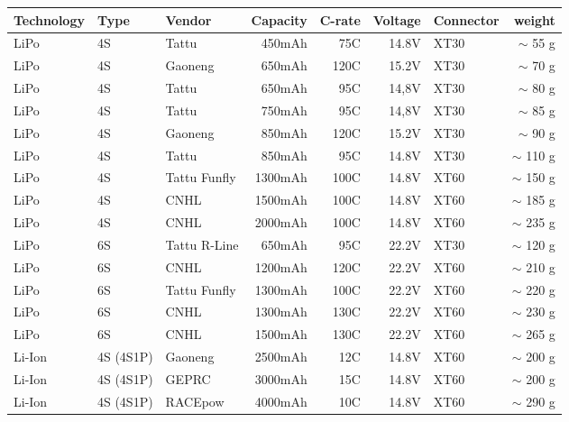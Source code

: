 \begin{paracol}{2}[]
\begin{table}[htb!]
\centering
{}
\label{TabelleAkkusGewicht}
\begin{tabularx}{\textwidth}{Xllrrrlr}
\toprule
Technology & Type & Vendor & Capacity & C-rate & Voltage & Connector & weight   \\
\midrule
LiPo   & 4S & Tattu              & 450mAh   & 75C  & 14.8V & XT30 & \(\sim\) 55 g   \\
LiPo   & 4S & Gaoneng            & 650mAh   & 120C & 15.2V & XT30 & \(\sim\) 70 g   \\
LiPo   & 4S & Tattu              & 650mAh   & 95C  & 14,8V & XT30 & \(\sim\) 80 g   \\
LiPo   & 4S & Tattu              & 750mAh   & 95C  & 14,8V & XT30 & \(\sim\) 85 g   \\
LiPo   & 4S & Gaoneng            & 850mAh   & 120C & 15.2V & XT30 & \(\sim\) 90 g   \\
LiPo   & 4S & Tattu              & 850mAh   & 95C  & 14.8V & XT30 & \(\sim\) 110 g   \\
LiPo   & 4S & Tattu Funfly       & 1300mAh  & 100C & 14.8V & XT60 & \(\sim\) 150 g   \\
LiPo   & 4S & CNHL               & 1500mAh  & 100C & 14.8V & XT60 & \(\sim\) 185 g   \\
LiPo   & 4S & CNHL               & 2000mAh  & 100C & 14.8V & XT60 & \(\sim\) 235 g   \\
\midrule
LiPo   & 6S & Tattu R-Line       & 650mAh   & 95C  & 22.2V & XT30 & \(\sim\) 120 g   \\
LiPo   & 6S & CNHL               & 1200mAh  & 120C & 22.2V & XT60 & \(\sim\) 210 g   \\
LiPo   & 6S & Tattu Funfly       & 1300mAh  & 100C & 22.2V & XT60 & \(\sim\) 220 g   \\
LiPo   & 6S & CNHL               & 1300mAh  & 130C & 22.2V & XT60 & \(\sim\) 230 g   \\
LiPo   & 6S & CNHL               & 1500mAh  & 130C & 22.2V & XT60 & \(\sim\) 265 g   \\
\midrule
Li-Ion & 4S (4S1P) & Gaoneng     & 2500mAh  & 12C  & 14.8V & XT60  & \(\sim\) 200 g   \\
Li-Ion & 4S (4S1P) & GEPRC       & 3000mAh  & 15C  & 14.8V & XT60  & \(\sim\) 200 g   \\
Li-Ion & 4S (4S1P) & RACEpow     & 4000mAh  & 10C  & 14.8V & XT60  & \(\sim\) 290 g   \\

\end{tabularx}
\end{table}
\end{paracol}
